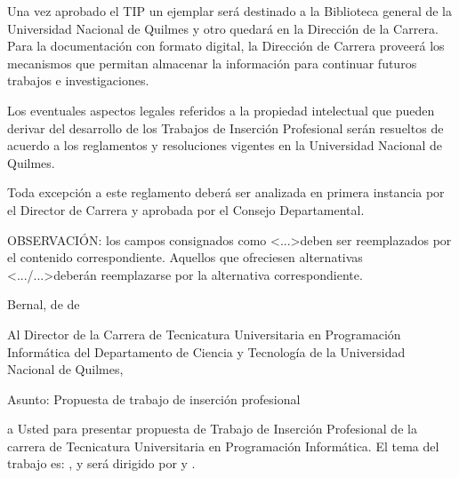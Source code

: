 
\articulo Una vez aprobado el TIP un ejemplar será destinado a la
Biblioteca general de la Universidad Nacional de Quilmes y otro quedará en la
Dirección de la Carrera. Para la documentación con formato digital, la Dirección de Carrera
proveerá los mecanismos que permitan almacenar la información para continuar futuros trabajos e investigaciones.

\articulo Los eventuales aspectos legales referidos a la propiedad
intelectual que pueden derivar del desarrollo de los Trabajos de Inserción Profesional
serán resueltos de acuerdo a los reglamentos y resoluciones vigentes en la
Universidad Nacional de Quilmes.


\articulo Toda excepción a este reglamento deberá ser analizada en
primera instancia por el Director de Carrera y aprobada por el Consejo Departamental.

\newpage
\resetAnexosCounter
{}

OBSERVACIÓN: los campos consignados como \textless...\textgreater deben ser reemplazados
por el contenido correspondiente. Aquellos que ofreciesen alternativas
 \textless.../...\textgreater deberán reemplazarse por la alternativa
 correspondiente.

\begin{flushright}
Bernal,  de  de \end{flushright}

Al Director de la Carrera de Tecnicatura Universitaria en Programación Informática del
Departamento de Ciencia y Tecnología de la
Universidad Nacional de Quilmes,\\

\hrulefill

Asunto: Propuesta de trabajo de inserción profesional

 a Usted para presentar 
propuesta de Trabajo de Inserción Profesional de la carrera de Tecnicatura
Universitaria en Programación Informática. El tema del trabajo es: , y será dirigido por  y .

